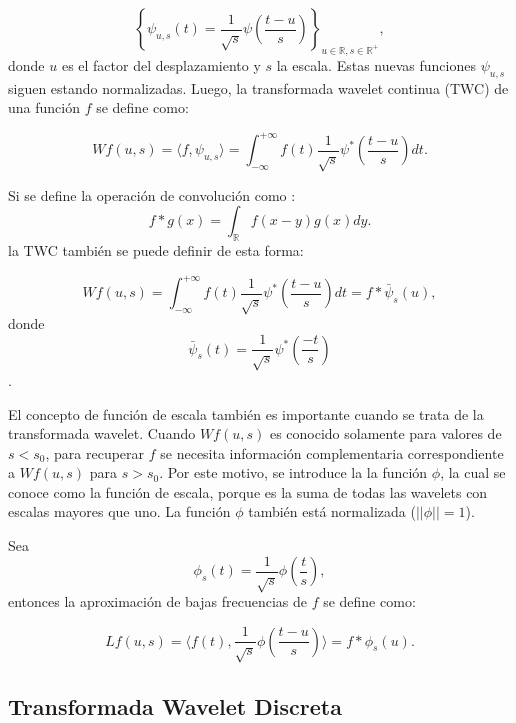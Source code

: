 \begin{equation}
	\left\{ \psi_{u,s}(t)= \frac{1}{\sqrt{s}}\psi \left(\frac{t-u}{s}\right) \right\}_{u \in \mathbb{R}, s \in \mathbb{R^+}},
\end{equation}
\noindent donde $u$ es el factor del desplazamiento y $s$ la escala. Estas nuevas funciones $\psi_{u,s}$ siguen estando
normalizadas. Luego, la transformada wavelet continua (TWC) de una función $f$ se define como:

\begin{equation}
	Wf(u,s) = \langle f,\psi_{u,s} \rangle = \int_{-\infty}^{+\infty}  f(t)\frac{1}{\sqrt{s}}\psi^*\left(\frac{t-u}{s}\right) dt.
\end{equation}

Si se define la operación de convolución como :
\begin{equation}
	f*g(x) = \int_{\mathbb{R}} f(x-y)g(x)dy.
\end{equation}
\noindent la TWC también se puede definir de esta forma:

\begin{equation}
	Wf(u,s) = \int_{-\infty}^{+\infty}  f(t)\frac{1}{\sqrt{s}}\psi^*\left(\frac{t-u}{s}\right) dt = f*\bar \psi_s(u),
\end{equation}
\noindent donde $$\bar \psi_s(t)=\frac{1}{\sqrt{s}}\psi^*\left(\frac{-t}{s}\right)$$.

El concepto de función de escala también es importante cuando se trata de la transformada wavelet. 
Cuando $Wf(u,s)$ es conocido solamente para valores de $s<s_0$, para recuperar $f$ se necesita información
complementaria correspondiente a $Wf(u,s)$ para $s>s_0$. Por este motivo, se introduce la 
la función $\phi$, la cual se conoce como la función de escala, porque es la suma de todas las wavelets con
escalas mayores que uno. La función $\phi$ también está normalizada ($||\phi||=1$).

Sea 
\begin{equation}
	\phi_s(t) = \frac{1}{\sqrt{s}}\phi\left(\frac{t}{s}\right),
\end{equation}
\noindent entonces la aproximación de bajas frecuencias de $f$ se define como:

\begin{equation}
	Lf(u,s) = \langle f(t),\frac{1}{\sqrt{s}}\phi\left(\frac{t-u}{s}\right) \rangle = f*\phi_s(u).
\end{equation}


\subsection{Transformada Wavelet Discreta }

